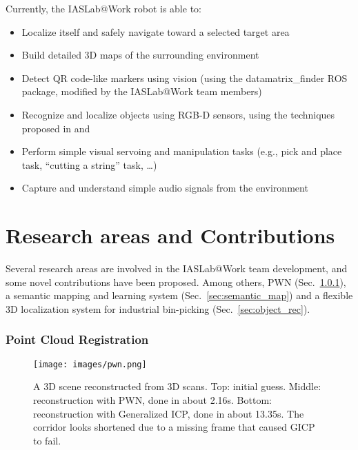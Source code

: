 \documentclass[conference]{IEEEtran}
\begin{document}
Currently, the IASLab@Work robot is able to:

\begin{itemize}
 \item Localize itself and safely navigate toward a selected target area
 \item Build detailed 3D maps of the surrounding environment
 \item Detect QR code-like markers using vision (using the datamatrix\_finder ROS package, modified by the IASLab@Work team members)
 \item Recognize and localize objects using RGB-D sensors, using the techniques proposed in \cite{antonelloVISIGRAPP2014} and \cite{prettoCASE2013}
 \item Perform simple visual servoing and manipulation tasks (e.g., pick and place task, ``cutting a string'' task, \dots)
 \item Capture and understand simple audio signals from the environment
\end{itemize}

 
\section{Research areas and Contributions}\label{sec:research}

Several research areas are involved in the IASLab@Work team development, and some novel contributions have been proposed. Among others, PWN (Sec.~\ref{sec:pwn}), a semantic mapping and learning system (Sec.~\ref{sec:semantic_map}) and a flexible 3D localization system for industrial bin-picking (Sec.~\ref{sec:object_rec}).

\subsubsection{Point Cloud Registration}\label{sec:pwn}

\begin{figure}[t!]
\begin{center}
\texttt{[image: images/pwn.png]}
\end{center}
\caption{A 3D scene reconstructed from 3D scans. Top: initial guess. Middle: reconstruction with PWN, done in about 2.16s. Bottom: reconstruction with Generalized ICP, done in about 13.35s. The corridor looks shortened due to a missing frame that caused GICP to fail.}\label{fig:pwn}
\end{figure}
\end{document}
